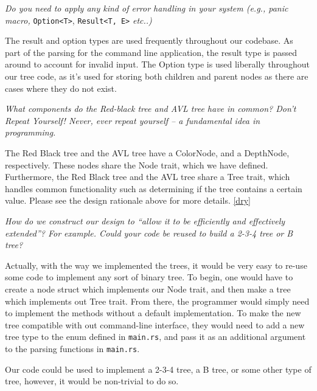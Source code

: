 \documentclass[letterpaper]{article}
\begin{document}
\textit{Do you need to apply any kind of error handling in your system (e.g.,
	panic macro,}
\verb|Option<T>|, \verb|Result<T, E>| \textit{etc..)}

The result and option types are used frequently throughout our
codebase. As part of the parsing for the command line application, the
result type is passed around to account for invalid input. The Option
type is used liberally throughout our tree code, as it's used for
storing both children and parent nodes as there are cases where they
do not exist.

\textit{What components do the Red-black tree and AVL tree have in common? Don’t Repeat
	Yourself! Never, ever repeat yourself – a fundamental idea in programming.}

The Red Black tree and the AVL tree have a ColorNode, and a DepthNode,
respectively. These nodes share the Node trait, which we have defined.
Furthermore, the Red Black tree and the AVL tree share a Tree trait, which
handles common functionality such as determining if the tree contains a certain
value.
Please see the design rationale above for more details. \ref{dry}

\textit{How do we construct our design to “allow it to be efficiently and
	effectively extended”? For example. Could your code be reused to build a 2-3-4
	tree or B tree?}

Actually, with the way we implemented the trees, it would be very easy to re-use
some code to implement any sort of binary tree.  To begin, one would have to
create a node struct which implements our Node trait, and then make a tree which
implements out Tree trait. From there, the programmer would simply need to
implement the methods without a default implementation.  To make the new tree
compatible with out command-line interface, they would need to add a new tree
type to the enum defined in \texttt{main.rs}, and pass it as an additional
argument to the parsing functions in \texttt{main.rs}.

Our code could be used to implement a
2-3-4 tree, a B tree, or some other type of tree,
however, it would be non-trivial to do so.



\end{document}
